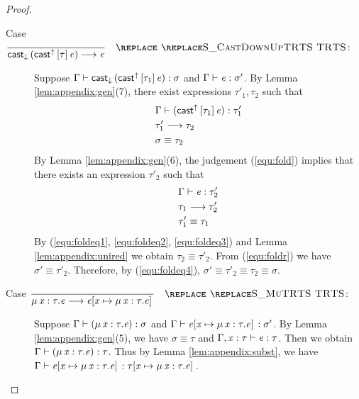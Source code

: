 \begin{proof}
\begin{description}
        \item[Case $\ottdruleSXXCastDownUp{}$:] $\quad$ \\
        Suppose $\Gamma  \vdash  \mathsf{cast}_{\downarrow} \, (  \mathsf{cast}^{\uparrow} \, [  \tau_{{\mathrm{1}}}  ] \,  \mathit{e}  )  :  \sigma$ and $\Gamma  \vdash  \mathit{e}  :  \sigma'$. By
Lemma \ref{lem:appendix:gen}(7), there exist expressions $\tau'_{{\mathrm{1}}}, \tau_{{\mathrm{2}}}$ such
that 
        \begin{align}
            &\Gamma  \vdash  (  \mathsf{cast}^{\uparrow} \, [  \tau_{{\mathrm{1}}}  ] \,  \mathit{e}  )  :  \tau'_{{\mathrm{1}}} \label{equ:fold} \\
            &\tau'_{{\mathrm{1}}}  \longrightarrow  \tau_{{\mathrm{2}}} \label{equ:foldeq1} \\
            &\sigma  \equiv  \tau_{{\mathrm{2}}} \label{equ:foldeq4}
        \end{align}
        By Lemma \ref{lem:appendix:gen}(6), the judgement (\ref{equ:fold})
implies that there exists an expression $\tau'_{{\mathrm{2}}}$ such that
        \begin{align}
            &\Gamma  \vdash  \mathit{e}  :  \tau'_{{\mathrm{2}}} \label{equ:foldr} \\
            &\tau_{{\mathrm{1}}}  \longrightarrow  \tau'_{{\mathrm{2}}} \label{equ:foldeq2} \\
            &\tau'_{{\mathrm{1}}}  \equiv  \tau_{{\mathrm{1}}} \label{equ:foldeq3}
        \end{align}
        By (\ref{equ:foldeq1}, \ref{equ:foldeq2}, \ref{equ:foldeq3}) and Lemma
\ref{lem:appendix:unired} we obtain $\tau_{{\mathrm{2}}}  \equiv  \tau'_{{\mathrm{2}}}$. From (\ref{equ:foldr}) we
have $\sigma'  \equiv  \tau'_{{\mathrm{2}}}$. Therefore, by (\ref{equ:foldeq4}), $\sigma'  \equiv  \tau'_{{\mathrm{2}}}
 \equiv  \tau_{{\mathrm{2}}}  \equiv  \sigma$.
        
        \item[Case $\ottdruleSXXMu{}$:] $\quad$ \\
        Suppose $\Gamma  \vdash  (  \mu \, \mathit{x}  :  \tau  .  \mathit{e}  )  :  \sigma$ and $\Gamma  \vdash  \mathit{e}  [  \mathit{x}  \mapsto  \mu \, \mathit{x}  :  \tau  .  \mathit{e}  ] \,  :  \sigma'$.
By Lemma \ref{lem:appendix:gen}(5), we have $\sigma  \equiv  \tau$ and $\Gamma  ,  \mathit{x}  :  \tau  \vdash  \mathit{e}  :  \tau$. Then we obtain $\Gamma  \vdash  (  \mu \, \mathit{x}  :  \tau  .  \mathit{e}  )  :  \tau$. Thus by Lemma
\ref{lem:appendix:subst}, we have $\Gamma  \vdash  \mathit{e}  [  \mathit{x}  \mapsto  \mu \, \mathit{x}  :  \tau  .  \mathit{e}  ] \,  :  \tau  [  \mathit{x}  \mapsto  \mu \, \mathit{x}  :  \tau  .  \mathit{e}  ] \,$.
        

\end{description}
\end{proof}
